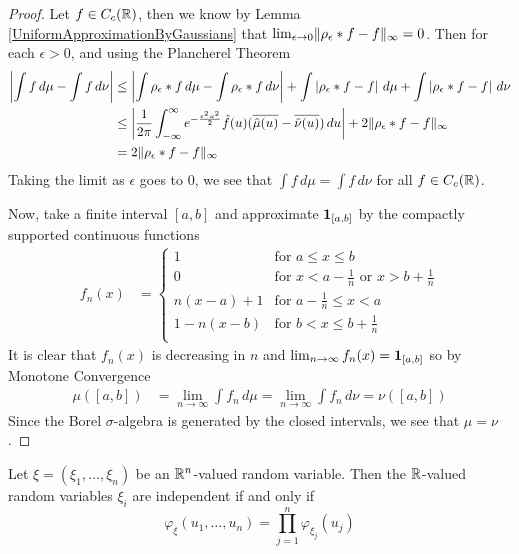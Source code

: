 \begin{proof}
Let $f \in C_c(\mathbb{R})$, then we know by Lemma
\ref{UniformApproximationByGaussians} that $\lim_{\epsilon \to 0}
\lVert \rho_\epsilon * f - f \rVert_\infty = 0$.  Then for each $\epsilon >
0$, and using the Plancherel Theorem
\begin{align*}
\left \vert \int f \, d\mu - \int f \, d\nu \right \vert &\leq \left \vert \int \rho_\epsilon *
  f \, d\mu - \int \rho_\epsilon * f \, d\nu \right \vert + \int \left \vert \rho_\epsilon *
  f  - f \right \vert\, d\mu + \int \left \vert \rho_\epsilon *
  f  - f \right \vert\, d\nu \\
&\leq \left \vert \frac{1}{2\pi} \int_{-\infty}^\infty e^{-\frac{\epsilon^2
      u^2}{2}} \hat{f}(u) (\overline{\hat{\mu}(u)} - \overline{\hat{\nu}(u)})\, du \right \vert+ 2\lVert \rho_\epsilon *
  f  - f \rVert_\infty \\
&=  2\lVert \rho_\epsilon *
  f  - f \rVert_\infty 
\end{align*}
Taking the limit as $\epsilon$ goes to $0$, we see that $\int f \,
d\mu = \int f \, d\nu$ for all $f \in C_c(\mathbb{R})$.

Now, take a finite interval $[a,b]$ and approximate
$\textbf{1}_{[a,b]}$ by the compactly supported continuous
functions
\begin{align*}
f_n(x) &= \begin{cases}
1 & \text{for $a \leq x \leq b$} \\
0 & \text{for $x < a- \frac{1}{n}$ or $x > b + \frac{1}{n}$} \\
n(x-a) + 1 & \text{for $a-\frac{1}{n} \leq x < a$} \\
1 - n(x-b)& \text{for $b < x \leq b + \frac{1}{n}$} \\
\end{cases}
\end{align*}
It is clear that $f_n(x)$ is decreasing in $n$ and $\lim_{n \to
  \infty}f_n(x) = \textbf{1}_{[a,b]}$ so by Monotone Convergence
\begin{align*}
\mu([a,b]) &= \lim_{n \to \infty} \int f_n \,
d\mu = \lim_{n \to \infty} \int f_n \,
d\nu = \nu([a,b])
\end{align*}
Since the Borel $\sigma$-algebra is generated by the closed intervals,
we see that $\mu = \nu$.
\end{proof}
\begin{thm}\label{IndependenceProductCharacteristicFunctions} Let $\xi = \left( \xi_1, \ldots , \xi_n \right)$ be an
    $\mathbb{R}^n$-valued random variable.  Then the $\mathbb{R}$-valued
    random variables $\xi_i$ are independent if and only if 
\begin{equation*}
\varphi_\xi(u_1, \ldots , u_n) = \prod_{j=1}^n \varphi_{\xi_j}(u_j)
\end{equation*}
\end{thm}
